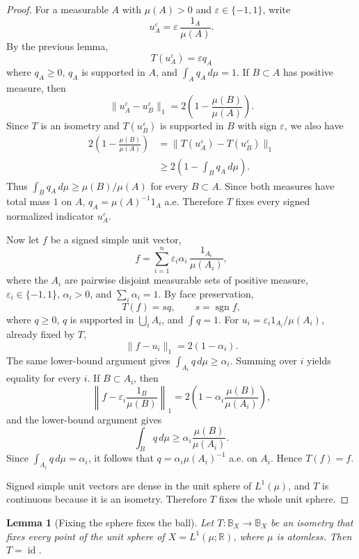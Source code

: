 \documentclass[11pt]{article}
\newtheorem{lemma}{Lemma}
\newcommand{\B}{\mathbb{B}}
\newcommand{\R}{\mathbb{R}}
\newcommand{\id}{\operatorname{id}}
\newcommand{\sgn}{\operatorname{sgn}}
\begin{document}
\begin{proof}
For a measurable \(A\) with \(\mu(A)>0\) and \(\varepsilon\in\{-1,1\}\), write
\[
   u_A^\varepsilon=\varepsilon\,\frac{1_A}{\mu(A)} .
\]
By the previous lemma,
\[
   T(u_A^\varepsilon)=\varepsilon q_A
\]
where \(q_A\ge0\), \(q_A\) is supported in \(A\), and \(\int_A q_A\,d\mu=1\).
If \(B\subset A\) has positive measure, then
\[
   \|u_A^\varepsilon-u_B^\varepsilon\|_1
      =2\left(1-\frac{\mu(B)}{\mu(A)}\right).
\]
Since \(T\) is an isometry and \(T(u_B^\varepsilon)\) is supported in \(B\)
with sign \(\varepsilon\), we also have
\[
\begin{aligned}
2\left(1-\frac{\mu(B)}{\mu(A)}\right)
&=\|T(u_A^\varepsilon)-T(u_B^\varepsilon)\|_1\\
&\ge 2\left(1-\int_B q_A\,d\mu\right).
\end{aligned}
\]
Thus \(\int_B q_A\,d\mu\ge \mu(B)/\mu(A)\) for every \(B\subset A\). Since
both measures have total mass \(1\) on \(A\), \(q_A=\mu(A)^{-1}1_A\) a.e.
Therefore \(T\) fixes every signed normalized indicator \(u_A^\varepsilon\).

Now let \(f\) be a signed simple unit vector,
\[
   f=\sum_{i=1}^n \varepsilon_i\alpha_i\,\frac{1_{A_i}}{\mu(A_i)},
\]
where the \(A_i\) are pairwise disjoint measurable sets of positive measure,
\(\varepsilon_i\in\{-1,1\}\), \(\alpha_i>0\), and \(\sum_i\alpha_i=1\). By
face preservation,
\[
   T(f)=s q,\qquad s=\sgn f,
\]
where \(q\ge0\), \(q\) is supported in \(\bigcup_i A_i\), and \(\int q=1\).
For \(u_i=\varepsilon_i1_{A_i}/\mu(A_i)\), already fixed by \(T\),
\[
   \|f-u_i\|_1=2(1-\alpha_i).
\]
The same lower-bound argument gives \(\int_{A_i}q\,d\mu\ge\alpha_i\). Summing
over \(i\) yields equality for every \(i\). If \(B\subset A_i\), then
\[
   \left\|f-\varepsilon_i\frac{1_B}{\mu(B)}\right\|_1
      =2\left(1-\alpha_i\frac{\mu(B)}{\mu(A_i)}\right),
\]
and the lower-bound argument gives
\[
   \int_B q\,d\mu\ge \alpha_i\frac{\mu(B)}{\mu(A_i)} .
\]
Since \(\int_{A_i}q\,d\mu=\alpha_i\), it follows that
\(q=\alpha_i\mu(A_i)^{-1}\) a.e. on \(A_i\). Hence \(T(f)=f\).

Signed simple unit vectors are dense in the unit sphere of \(L^1(\mu)\), and
\(T\) is continuous because it is an isometry. Therefore \(T\) fixes the whole
unit sphere.
\end{proof}

\begin{lemma}[Fixing the sphere fixes the ball]
Let \(T:\B_X\to\B_X\) be an isometry that fixes every point of the unit sphere
of \(X=L^1(\mu;\R)\), where \(\mu\) is atomless. Then \(T=\id\).
\end{lemma}
\end{document}
